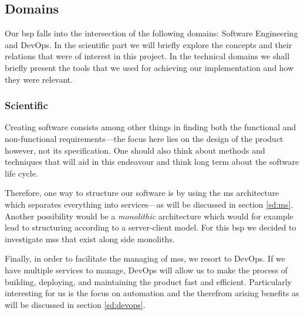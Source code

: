 \subsection{Domains}


Our \gls{bsp} falls into the intersection of the following domains:
Software Engineering and DevOps. In the scientific part we will briefly
explore the concepts and their relations that were of interest in this
project. In the technical domains we shall briefly present the tools
that we used for achieving our implementation and how they were relevant.

\subsubsection{Scientific}


Creating software consists among other things in finding both the
functional and non-functional requirements---the focus here lies on the
design of the product however, not its specification.
One should also think about methods and
techniques that will aid in this endeavour and think long term about
the software life cycle.

Therefore, one way to structure our software is by using the \gls{ms}
architecture which separates everything into services---as will be
discussed in section \ref{sd:ms}. Another possibility would be a
\textit{monolithic} architecture which would for example lead to
structuring according to a server-client model. For this \gls{bsp} we
decided to investigate \glspl{ms} that exist along side monoliths.

Finally, in order to facilitate the managing of \glspl{ms}, we resort
to DevOps.\cite{devops-culture} If we have multiple
services to manage, DevOps will allow us to make the process of
building, deploying, and maintaining the product fast and efficient.
Particularly interesting for us is the focus on automation and the
therefrom arising benefits as will be discussed in section
\ref{sd:devops}.


